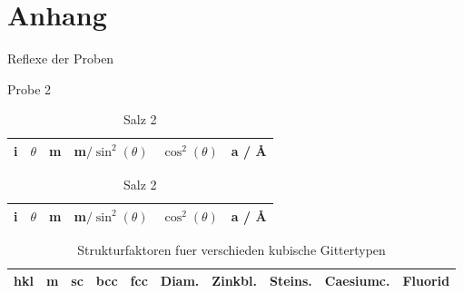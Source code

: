 \newpage
\section{Anhang}\label{sec:Anhang}

\begin{table}[ht]
		\centering
		\caption{Reflexe der Proben}
		\label{tab:wink}
		\begin{subtable}{\textwidth}
				\centering
				\caption{Probe 2}
				\begin{tabular}{c c c c c c}
						\toprule
						i & $\theta$ & m & m$/\sin^2(\theta)$ & $\cos^2(\theta)$
						  & a / \AA \\ \midrule
						
						\bottomrule
				\end{tabular}
		\end{subtable}
		\begin{subtable}{\textwidth}
				\centering
				\caption{Salz 2}
				\begin{tabular}{c c c c c c}
						\toprule
						i & $\theta$ & m & m$/\sin^2(\theta)$ & $\cos^2(\theta)$
						  & a / \AA \\ 
						\midrule
						
						\bottomrule
				\end{tabular}
		\end{subtable}
\end{table}

\begin{table}[ht]
		\centering
		\caption{Strukturfaktoren fuer verschieden kubische Gittertypen}
		\label{tab:struct}
		\begin{tabular}{c c c c c c c c c c}
				\toprule
				hkl & m & sc & bcc & fcc & Diam. & Zinkbl. & Steins. & Caesiumc. & Fluorid \\ 
				\midrule
					
				\bottomrule
		\end{tabular}
\end{table}


